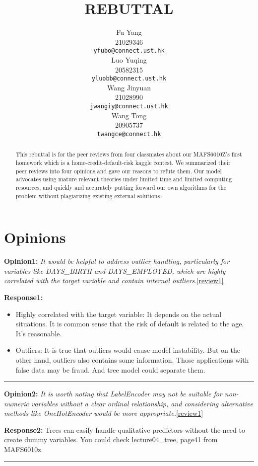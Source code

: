 \documentclass{article}
\title{REBUTTAL
}
\author{%
  Fu Yang \\
  21029346\\
  \texttt{yfubo@connect.ust.hk} \\
  \And
  Luo Yuqing \\
  20582315\\
  \texttt{yluobb@connect.ust.hk} \\
  \AND
  Wang Jinyuan \\
  21028990\\
  \texttt{jwangiy@connect.ust.hk} \\
  \And
  Wang Tong \\
  20905737\\
  \texttt{twangce@connect.hk} \\
}
\begin{document}
\maketitle


\begin{abstract}
This rebuttal is for the peer reviews from four classmates about our MAFS6010Z's first homework which is a home-credit-default-risk kaggle contest. We summarized their peer reviews into four opinions and gave our reasons to refute them. Our model advocates using mature relevant theories under limited time and limited computing resources, and quickly and accurately putting forward our own algorithms for the problem without plagiarizing existing external solutions.
\end{abstract}

\section{Opinions}
\textbf{Opinion1:} 
\textit{It would be helpful to address outlier handling, particularly for variables like DAYS\_BIRTH and DAYS\_EMPLOYED, which are highly correlated with the target variable and contain internal outliers.}\ref{review1}

\textbf{Response1:} 
\begin{itemize}
    \item Highly correlated with the target variable: It depends on the actual situations. It is common sense that the risk of default is related to the age. It's reasonable.
    \item Outliers: It is true that outliers would cause model instability. But on the other hand, outliers also contains some information. Those applications with false data may be fraud. And tree model could separate them.
\end{itemize}

\noindent\rule[0.5ex]{16cm}{1pt}

\textbf{Opinion2:} 
\textit{It is worth noting that LabelEncoder may not be suitable for non-numeric variables without a clear ordinal relationship, and considering alternative methods like OneHotEncoder would be more appropriate.}\ref{review1}

\textbf{Response2:}
Trees can easily handle qualitative predictors without the need to create dummy variables. You could check lecture04\_tree, page41 from MAFS6010z.\cite{yaoyuan1}

\noindent\rule[0.5ex]{16cm}{1pt}
\end{document}
